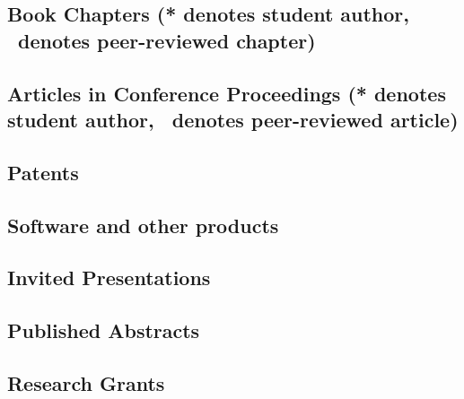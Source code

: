 \documentclass[10pt]{article}
\begin{document}
    \subsection[Book Chapters]{Book Chapters (* denotes student author, \peerrevmark\ denotes peer-reviewed chapter)}
    \begin{refsection}
        \nocite{*}
        \printbibliography[heading=none,type=incollection]
    \end{refsection}
	\subsection[Articles in Conference Proceedings]{Articles in Conference Proceedings (* denotes student author, \peerrevmark\ denotes peer-reviewed article)}
    \begin{refsection}
        \nocite{*}
        \printbibliography[heading=none,type=inproceedings]
    \end{refsection}
  \subsection{Patents}
    \begin{refsection}
        \nocite{*}
        \printbibliography[heading=none,type=patent]
       \end{refsection}
  \subsection{Software and other products}
	
	\subsection{Invited Presentations}
    \begin{enumerate}
    
    
    \end{enumerate}
	\subsection{Published Abstracts}
    \begin{enumerate}
    
    
    \end{enumerate}
	\subsection{Research Grants}
	
\iftrue
\end{document}
